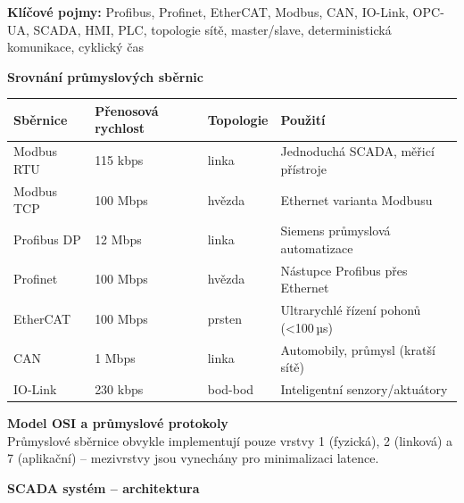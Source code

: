 \documentclass[a4paper,10pt]{article}
\begin{document}
\begin{pojmybox}
\textbf{Klíčové pojmy:}
Profibus, Profinet, EtherCAT, Modbus, CAN, IO-Link,
OPC-UA, SCADA, HMI, PLC, topologie sítě,
master/slave, deterministická komunikace, cyklický čas
\end{pojmybox}

\begin{vysvetlenibox}
\textbf{Srovnání průmyslových sběrnic}

\begin{center}
\begin{tabularx}{0.95\linewidth}{@{} l l l X @{}}
    \toprule
    \textbf{Sběrnice} & \textbf{Přenosová rychlost}
                      & \textbf{Topologie} & \textbf{Použití} \\
    \midrule
    Modbus RTU  & 115 kbps   & linka     & Jednoduchá SCADA, měřicí přístroje \\
    Modbus TCP  & 100 Mbps   & hvězda    & Ethernet varianta Modbusu \\
    Profibus DP & 12 Mbps    & linka     & Siemens průmyslová automatizace \\
    Profinet    & 100 Mbps   & hvězda    & Nástupce Profibus přes Ethernet \\
    EtherCAT    & 100 Mbps   & prsten    & Ultrarychlé řízení pohonů (\textless{}100\,µs) \\
    CAN         & 1 Mbps     & linka     & Automobily, průmysl (kratší sítě) \\
    IO-Link     & 230 kbps   & bod-bod   & Inteligentní senzory/aktuátory \\
    \bottomrule
\end{tabularx}
\end{center}

\textbf{Model OSI a průmyslové protokoly}\\
Průmyslové sběrnice obvykle implementují pouze vrstvy 1 (fyzická),
2 (linková) a 7 (aplikační) -- mezivrstvy jsou vynechány pro minimalizaci
latence.

\textbf{SCADA systém -- architektura}

\begin{center}
\end{center}


\end{vysvetlenibox}
\end{document}

